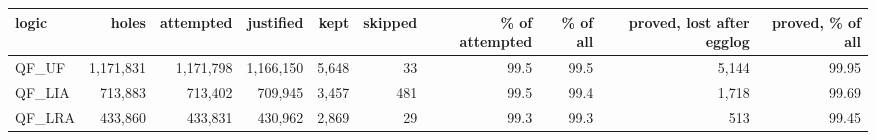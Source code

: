 \begin{tabular}{lrrrrrrrrr}
\toprule
logic & holes & attempted & justified & kept & skipped & \% of attempted & \% of all & proved, lost after egglog & proved, \% of all \\
\midrule
QF\_UF & 1,171,831 & 1,171,798 & 1,166,150 & 5,648 & 33 & 99.5 & 99.5 & 5,144 & 99.95 \\
QF\_LIA & 713,883 & 713,402 & 709,945 & 3,457 & 481 & 99.5 & 99.4 & 1,718 & 99.69 \\
QF\_LRA & 433,860 & 433,831 & 430,962 & 2,869 & 29 & 99.3 & 99.3 & 513 & 99.45 \\
\bottomrule
\end{tabular}
